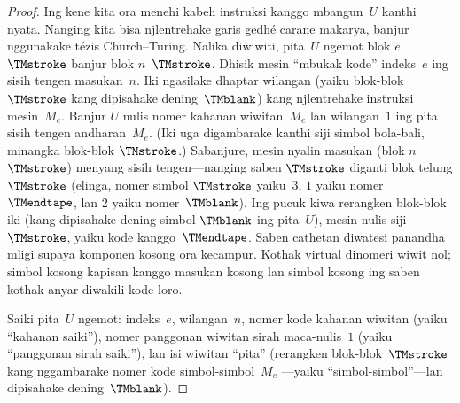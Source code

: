 \documentclass[../../../include/open-logic-section]{subfiles}
\begin{document}
\begin{proof}
  Ing kene kita ora menehi kabeh instruksi kanggo mbangun~$U$ kanthi nyata. Nanging kita bisa
  njlentrehake garis gedhé carane makarya, banjur
  nggunakake tézis Church--Turing. Nalika diwiwiti,
  pita~$U$ ngemot blok $e$~$\TMstroke$ banjur blok
  $n$~$\TMstroke$. Dhisik mesin ``mbukak kode''
  indeks~$e$ ing sisih tengen masukan~$n$. Iki
  ngasilake dhaptar wilangan (yaiku blok-blok
  $\TMstroke$ kang dipisahake dening~$\TMblank$)
  kang njlentrehake instruksi mesin~$M_e$. Banjur
  $U$ nulis nomer kahanan wiwitan~$M_e$ lan
  wilangan~$1$ ing pita sisih tengen andharan~$M_e$.
  (Iki uga digambarake kanthi siji simbol bola-bali,
  minangka blok-blok $\TMstroke$.) Sabanjure,
  mesin nyalin masukan (blok $n$~$\TMstroke$) menyang
  sisih tengen---nanging saben $\TMstroke$ diganti
  blok telung $\TMstroke$ (elinga, nomer simbol
  $\TMstroke$ yaiku~$3$, $1$ yaiku nomer~$\TMendtape$,
  lan $2$ yaiku nomer~$\TMblank$). Ing pucuk kiwa
  rerangken blok-blok iki (kang dipisahake dening
  simbol $\TMblank$ ing pita~$U$), mesin nulis
  siji~$\TMstroke$, yaiku kode kanggo~$\TMendtape$. Saben cathetan diwatesi panandha mligi supaya komponen kosong ora kecampur. Kothak virtual dinomeri wiwit nol; simbol kosong kapisan kanggo masukan kosong lan simbol kosong ing saben kothak anyar diwakili kode loro.

  Saiki pita~$U$ ngemot: indeks~$e$, wilangan~$n$,
  nomer kode kahanan wiwitan (yaiku ``kahanan saiki''),
  nomer panggonan wiwitan sirah maca-nulis~$1$
  (yaiku ``panggonan sirah saiki''), lan isi
  wiwitan ``pita'' (rerangken blok-blok~$\TMstroke$
  kang nggambarake nomer kode simbol-simbol~$M_e$
  ---yaiku ``simbol-simbol''---lan dipisahake
  dening~$\TMblank$).


\end{proof}
\end{document}

